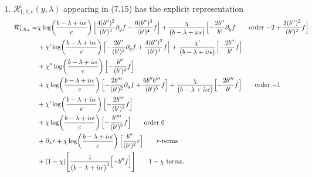 \documentclass[reqno,11pt]{amsart}
\numberwithin{equation}{section}
\newcommand{\p}{\partial}
\numberwithin{equation}{section} %
\begin{document}
\begin{enumerate}
    \item $\mathcal{R}^\iota_{1,0,\epsilon}(y,\lambda)$ appearing in (7.15) has the explicit representation
\setlength{\jot}{3pt}
\begin{align}
\mathcal{R}^\iota_{1,0,\epsilon}=&\chi\log\!\left(\frac{b-\lambda+i\iota\epsilon}{c}\right)\Bigl[\frac{4 (b'')^{2}}{(b')^{3}} \p_y f- \frac{6 (b'')^{3}}{(b' )^{4}} f\Bigr]+\frac{\chi}{\bigl(b -\lambda+i\iota\epsilon\bigr)}\Bigl[- \frac{2 b'' }{b' } \p_y f\tag*{\text{order $-2$}}+\frac{3 (b'' )^{2}}{(b' )^{2}} f\Bigr]\notag\\
&+\chi'\log\!\left(\frac{b -\lambda+i\iota\epsilon}{c}\right)\Bigl[- \frac{2 b'' }{(b' )^{2}} \p_y f+\frac{4 (b'' )^{2}}{(b' )^{3}} f\Bigr]+\frac{\chi'}{\bigl(b -\lambda+i\iota\epsilon\bigr)}\Bigl[- \frac{2 b'' }{b' } f\Bigr]\notag\\
&+\chi''\log\!\left(\frac{b -\lambda+i\iota\epsilon}{c}\right)\Bigl[- \frac{b'' }{(b' )^{2}} f\Bigr]\notag\\
&+\chi\log\!\left(\frac{b -\lambda+i\iota\epsilon}{c}\right)\Bigl[- \frac{2 b''' }{(b' )^{2}} \p_y f+\frac{6 b''  b''' }{(b' )^{3}} f\Bigr]+\frac{\chi}{\bigl(b -\lambda+i\iota\epsilon\bigr)}\Bigl[- \frac{2 b''' }{b' } f\Bigr]\tag*{\text{order $-1$}}\\
&+\chi'\log\!\left(\frac{b -\lambda+i\iota\epsilon}{c}\right)\Bigl[- \frac{2 b''' }{(b' )^{2}} f\Bigr]\notag\\
&+\chi\log\!\left(\frac{b -\lambda+i\iota\epsilon}{c}\right)\Bigl[- \frac{b'''' }{(b' )^{2}} f\Bigr]\tag*{\text{order $0$}}\\
&+\p_\lambda r+\chi\log\!\left(\frac{b -\lambda+i\iota\epsilon}{c}\right)\Bigl[\frac{b'' }{(b' )^{2}} r\Bigr]\tag*{\text{$r$-terms}}\\
&+(1-\chi)\Bigg[\frac{1}{\bigl(b -\lambda+i\iota\epsilon\bigr)^{2}}\Bigl[- b''  f\Bigr]\Bigg]\tag*{\text{$1-\chi$ terms}}.\\
&
\end{align}


\end{enumerate}
\end{document}
